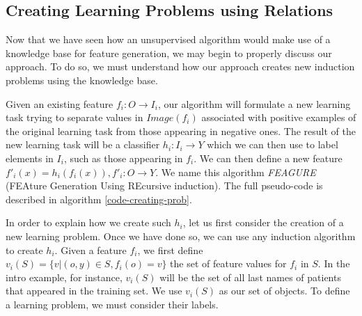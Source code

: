 \documentclass[twoside,11pt]{article}
\theoremstyle{definition}
\begin{document}
\subsection{Creating Learning Problems using Relations} \label{algorithm_section} 


Now that we have seen how an unsupervised algorithm would make use of a knowledge base for feature generation, we may begin to properly discuss our approach. To do so, we must understand how our approach creates new induction problems using the knowledge base.

Given an existing feature $f_{i}:O\rightarrow I_i$, our algorithm will formulate a new learning task trying to separate values in $Image(f_i)$ associated with positive examples of the original learning task from those appearing in negative ones. The result of the new learning task will be a classifier
$h_{i}:I_{i}\rightarrow Y$ which we can then use to label elements in $I_i$, such as those appearing in $f_{i}$. We can then define a new feature $f'_{i}(x)=h_{i}(f_{i}(x)), f'_{i}:O\rightarrow Y$.
We name this algorithm \emph{FEAGURE} (FEAture Generation Using REcursive induction). The full pseudo-code is described in algorithm \ref{code-creating-prob}.

In order to explain how we create such $h_{i}$, let us first consider the creation of a new learning problem. Once we have done so, we can use any induction algorithm to create $h_i$. 
Given a feature $f_{i}$, we first define $v_i(S) = \{v | (o,y) \in S, f_{i}(o)=v\}$ the set of feature values for $f_i$ in $S$. In the intro example, for instance, $v_i(S)$ will be the set of all last names of patients that appeared in the training set.
We use $v_i(S)$ as our set of objects. To define a learning problem, we must consider their labels. 
\end{document}
